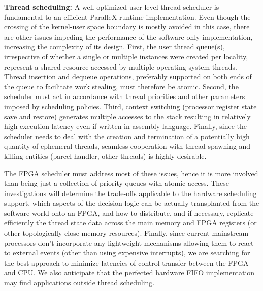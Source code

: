 \documentclass{revtex4}
\newcommand{\B}[1]{\textbf{#1}}
\begin{document}
\B{Thread scheduling:}
A well optimized user-level thread scheduler is fundamental to an
efficient ParalleX runtime implementation.
Even though the crossing of the kernel-user space boundary is mostly
avoided in this case, there are other issues impeding the performance
of the software-only implementation, increasing the complexity of its
design.
First, the user thread queue(s), irrespective of whether a single or
multiple instances were created per locality,
represent
a shared resource accessed by multiple operating system threads.
Thread insertion and dequeue operations, preferably supported on both
ends of the queue to facilitate work stealing, must therefore be atomic.
Second, the scheduler must act in accordance with thread priorities and
other parameters imposed by scheduling policies.
Third, context switching (processor register state save and restore)
generates multiple accesses to the stack resulting in relatively
high execution latency even if written in assembly language.
Finally, since the scheduler needs to deal with the creation and termination
of a potentially high quantity of ephemeral threads, seamless cooperation
with thread spawning and killing entities (parcel handler,
other threads) is highly desirable.

The FPGA scheduler must address most of these issues, hence it is more
involved than being just a collection of priority queues with atomic
access.
These investigations will determine the trade-offs applicable to the hardware
scheduling support, which aspects of the decision logic can be actually
transplanted from the software world onto an FPGA, and how to distribute,
and if necessary, replicate efficiently the thread state data across the
main memory and FPGA registers (or other topologically close memory
resources).
Finally, since current mainstream processors don't incorporate any
lightweight mechanisms allowing them to react to external events (other
than using expensive interrupts), we are searching for the best approach
to minimize latencies of control transfer between the FPGA and CPU.
We also anticipate that the perfected hardware FIFO implementation
may find applications outside thread scheduling.
\end{document}
